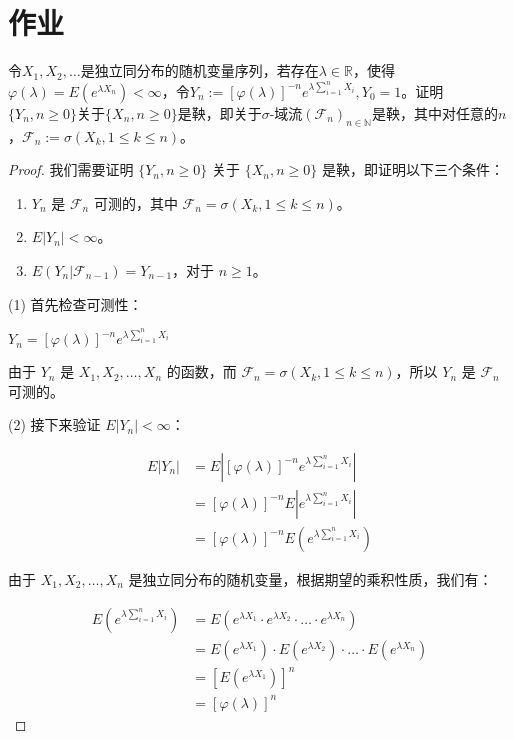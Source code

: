\documentclass[lang=cn,10pt,thmcnt=section]{elegantbook}
\begin{document}
\section{作业}
\begin{example}
	令$X_1, X_2, \ldots$是独立同分布的随机变量序列，若存在$\lambda \in \mathbb{R}$，使得$\varphi(\lambda) = E(e^{\lambda X_n}) < \infty$，令$Y_n := [\varphi(\lambda)]^{-n} e^{\lambda \sum_{i=1}^{n} X_i}, Y_0 = 1$。证明$\{Y_n, n \geq 0\}$关于$\{X_n, n \geq 0\}$是鞅，即关于$\sigma$-域流$(\mathcal{F}_n)_{n \in \mathbb{N}}$是鞅，其中对任意的$n$，$\mathcal{F}_n := \sigma(X_k, 1 \leq k \leq n)$。
\end{example}
\begin{proof}
	我们需要证明 $\{Y_n, n \geq 0\}$ 关于 $\{X_n, n \geq 0\}$ 是鞅，即证明以下三个条件：

\begin{enumerate}
    \item $Y_n$ 是 $\mathcal{F}_n$ 可测的，其中 $\mathcal{F}_n = \sigma(X_k, 1 \leq k \leq n)$。
    \item $E|Y_n| < \infty$。
    \item $E(Y_n|\mathcal{F}_{n-1}) = Y_{n-1}$，对于 $n \geq 1$。
\end{enumerate}

(1) 首先检查可测性：

$Y_n = [\varphi(\lambda)]^{-n} e^{\lambda \sum_{i=1}^{n} X_i}$

由于 $Y_n$ 是 $X_1, X_2, \ldots, X_n$ 的函数，而 $\mathcal{F}_n = \sigma(X_k, 1 \leq k \leq n)$，所以 $Y_n$ 是 $\mathcal{F}_n$ 可测的。

(2) 接下来验证 $E|Y_n| < \infty$：

\begin{align}
E|Y_n| &= E\left|[\varphi(\lambda)]^{-n} e^{\lambda \sum_{i=1}^{n} X_i}\right| \\
&= [\varphi(\lambda)]^{-n} E\left|e^{\lambda \sum_{i=1}^{n} X_i}\right| \\
&= [\varphi(\lambda)]^{-n} E\left(e^{\lambda \sum_{i=1}^{n} X_i}\right)
\end{align}

由于 $X_1, X_2, \ldots, X_n$ 是独立同分布的随机变量，根据期望的乘积性质，我们有：

\begin{align}
E\left(e^{\lambda \sum_{i=1}^{n} X_i}\right) &= E\left(e^{\lambda X_1} \cdot e^{\lambda X_2} \cdot \ldots \cdot e^{\lambda X_n}\right) \\
&= E(e^{\lambda X_1}) \cdot E(e^{\lambda X_2}) \cdot \ldots \cdot E(e^{\lambda X_n}) \\
&= [E(e^{\lambda X_1})]^n \\
&= [\varphi(\lambda)]^n
\end{align}


\end{proof}
\end{document}
